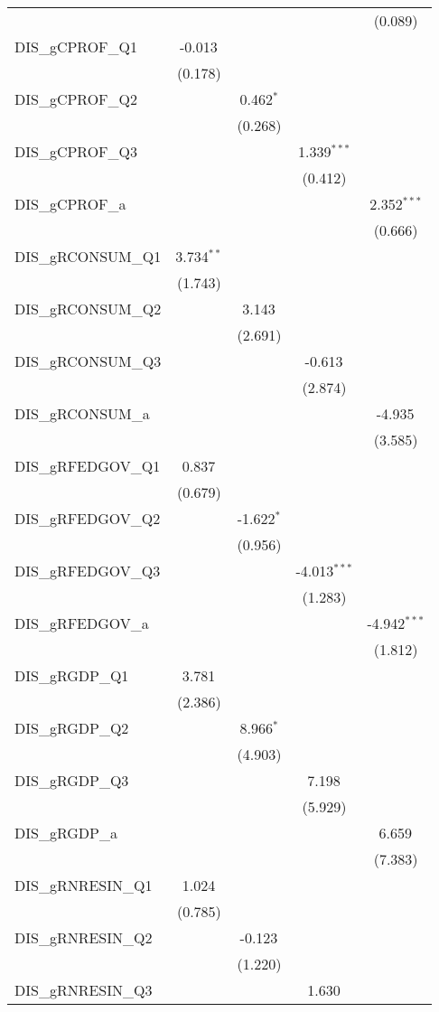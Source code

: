 \begin{table}[!htbp]
\begin{tabular}{@{\extracolsep{5pt}}lcccc}
& & & & (0.089) \\
 DIS_gCPROF_Q1 & -0.013$^{}$ & & & \\
& (0.178) & & & \\
 DIS_gCPROF_Q2 & & 0.462$^{*}$ & & \\
& & (0.268) & & \\
 DIS_gCPROF_Q3 & & & 1.339$^{***}$ & \\
& & & (0.412) & \\
 DIS_gCPROF_a & & & & 2.352$^{***}$ \\
& & & & (0.666) \\
 DIS_gRCONSUM_Q1 & 3.734$^{**}$ & & & \\
& (1.743) & & & \\
 DIS_gRCONSUM_Q2 & & 3.143$^{}$ & & \\
& & (2.691) & & \\
 DIS_gRCONSUM_Q3 & & & -0.613$^{}$ & \\
& & & (2.874) & \\
 DIS_gRCONSUM_a & & & & -4.935$^{}$ \\
& & & & (3.585) \\
 DIS_gRFEDGOV_Q1 & 0.837$^{}$ & & & \\
& (0.679) & & & \\
 DIS_gRFEDGOV_Q2 & & -1.622$^{*}$ & & \\
& & (0.956) & & \\
 DIS_gRFEDGOV_Q3 & & & -4.013$^{***}$ & \\
& & & (1.283) & \\
 DIS_gRFEDGOV_a & & & & -4.942$^{***}$ \\
& & & & (1.812) \\
 DIS_gRGDP_Q1 & 3.781$^{}$ & & & \\
& (2.386) & & & \\
 DIS_gRGDP_Q2 & & 8.966$^{*}$ & & \\
& & (4.903) & & \\
 DIS_gRGDP_Q3 & & & 7.198$^{}$ & \\
& & & (5.929) & \\
 DIS_gRGDP_a & & & & 6.659$^{}$ \\
& & & & (7.383) \\
 DIS_gRNRESIN_Q1 & 1.024$^{}$ & & & \\
& (0.785) & & & \\
 DIS_gRNRESIN_Q2 & & -0.123$^{}$ & & \\
& & (1.220) & & \\
 DIS_gRNRESIN_Q3 & & & 1.630$^{}$ & \\

\end{tabular}
\end{table}
